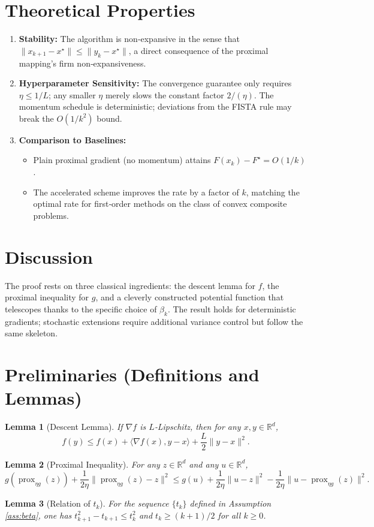 \documentclass{article}
\newtheorem{lemma}{Lemma}
\newcommand{\prox}{\operatorname{prox}}
\newcommand{\R}{\mathbb{R}}
\begin{document}
\section*{Theoretical Properties}
\begin{enumerate}[label=\arabic*.]
\item \textbf{Stability:} The algorithm is non‑expansive in the sense that $\|x_{k+1}-x^\star\|\le\|y_k-x^\star\|$, a direct consequence of the proximal mapping’s firm non‑expansiveness.
\item \textbf{Hyperparameter Sensitivity:} The convergence guarantee only requires $\eta\le 1/L$; any smaller $\eta$ merely slows the constant factor $2/(\eta)$. The momentum schedule is deterministic; deviations from the FISTA rule may break the $O(1/k^{2})$ bound.
\item \textbf{Comparison to Baselines:}
    \begin{itemize}
        \item Plain proximal gradient (no momentum) attains $F(x_k)-F^\star = O(1/k)$.
        \item The accelerated scheme improves the rate by a factor of $k$, matching the optimal rate for first‑order methods on the class of convex composite problems.
    \end{itemize}
\end{enumerate}

\section*{Discussion}
The proof rests on three classical ingredients: the descent lemma for $f$, the proximal inequality for $g$, and a cleverly constructed potential function that telescopes thanks to the specific choice of $\beta_k$. The result holds for deterministic gradients; stochastic extensions require additional variance control but follow the same skeleton.

\section*{Preliminaries (Definitions and Lemmas)}
\begin{lemma}[Descent Lemma]\label{lem:descent}
If $\nabla f$ is $L$‑Lipschitz, then for any $x,y\in\R^{d}$,
\[
f(y)\le f(x)+\langle\nabla f(x),y-x\rangle+\frac{L}{2}\|y-x\|^{2}.
\]
\end{lemma}
\begin{lemma}[Proximal Inequality]\label{lem:prox}
For any $z\in\R^{d}$ and any $u\in\R^{d}$,
\[
g(\prox_{\eta g}(z))+\frac{1}{2\eta}\|\prox_{\eta g}(z)-z\|^{2}
\le g(u)+\frac{1}{2\eta}\|u-z\|^{2}-\frac{1}{2\eta}\|u-\prox_{\eta g}(z)\|^{2}.
\]
\end{lemma}
\begin{lemma}[Relation of $t_k$]\label{lem:tk}
For the sequence $\{t_k\}$ defined in Assumption \ref{ass:beta}, one has $t_{k+1}^{2}-t_{k+1}\le t_{k}^{2}$ and $t_k\ge (k+1)/2$ for all $k\ge0$.
\end{lemma}
\end{document}
